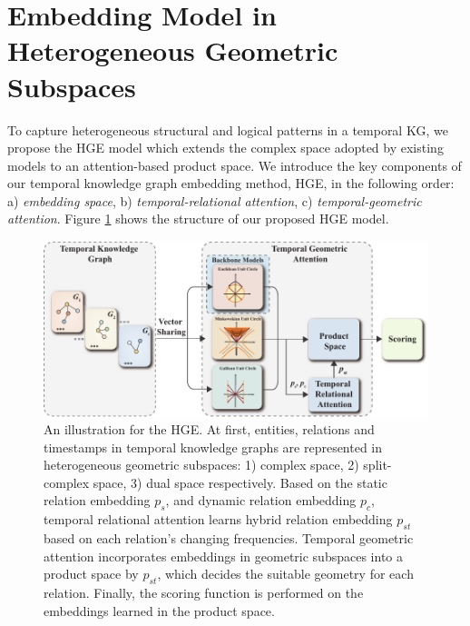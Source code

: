 \documentclass[letterpaper]{article} %
\begin{document}
\section{Embedding Model in Heterogeneous Geometric Subspaces}
To capture heterogeneous structural and logical patterns in a temporal KG, we propose the HGE model which extends the complex space adopted by existing models\cite{tltcomplexzhang2022along, tcomplexlacroix2020tensor} to an attention-based product space. We introduce the key components of our temporal knowledge graph embedding method, HGE, in the following order: 
a) \emph{embedding space},
b) \emph{temporal-relational attention}, 
c) \emph{temporal-geometric attention}. Figure \ref{fig:HGE_model} shows the structure of our proposed HGE model.


\begin{figure}[t]
    \centering
    \includegraphics[width=\textwidth]{HGE_model.pdf}
    \caption{
An illustration for the HGE. At first, entities, relations and timestamps in temporal knowledge graphs are represented in heterogeneous geometric subspaces: 1) complex space, 2) split-complex space, 3) dual space respectively. Based on the static relation embedding $p_{s}$, and dynamic relation embedding $p_{c}$, temporal relational attention learns hybrid relation embedding $p_{st}$ based on each relation's changing frequencies. Temporal geometric attention incorporates embeddings in geometric subspaces into a product space by $p_{st}$, which decides the suitable geometry for each relation. Finally, the scoring function is performed on the embeddings learned in the product space.  
    }
    \label{fig:HGE_model}
\end{figure}
\end{document}
